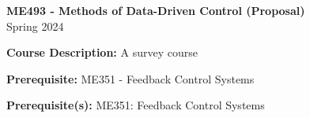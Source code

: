 \documentclass{article}
\begin{document}
\begin{onehalfspacing}
\begin{flushleft}

\vspace{-0.3in}
\large{\textbf{ME493 - Methods of Data-Driven Control (Proposal)}} \\
\large{Spring 2024}

\normalsize
\vspace{.2in}



\textbf{Course Description:} A survey course

\vspace{.1in}

\textbf{Prerequisite:} ME351 - Feedback Control Systems

\textbf{Prerequisite(s):} ME351: Feedback Control Systems


\end{flushleft}
\end{onehalfspacing}
\end{document}
